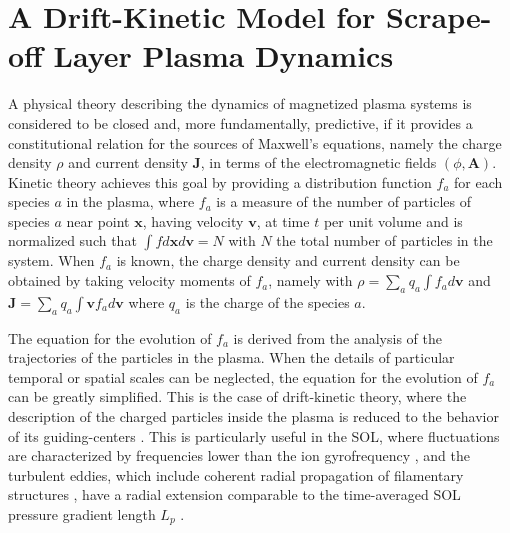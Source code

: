 \chapter{A Drift-Kinetic Model for Scrape-off Layer Plasma Dynamics}
\label{ch:dk}

A physical theory describing the dynamics of magnetized plasma systems is considered to be closed and, more fundamentally, predictive, if it provides a constitutional relation for the sources of Maxwell's equations, namely the charge density $\rho$ and current density $\mathbf{J}$, in terms of the electromagnetic fields $(\phi, \mathbf{A})$.
%
Kinetic theory achieves this goal by providing a distribution function $f_a$ for each species $a$ in the plasma, where $f_a$ is a measure of the number of particles of species $a$ near point $\mathbf x$, having velocity $\mathbf v$, at time $t$ per unit volume and is normalized such that $\int f d\mathbf x d\mathbf v=N$ with $N$ the total number of particles in the system.
%
When $f_a$ is known, the charge density and current density can be obtained by taking velocity moments of $f_a$, namely with $\rho=\sum_a q_a \int f_a d\mathbf v$ and $\mathbf{J}= \sum_a q_a \int \mathbf v f_a d \mathbf v$ where $q_a$ is the charge of the species $a$.

The equation for the evolution of $f_a$ is derived from the analysis of the trajectories of the particles in the plasma.
%
When the details of particular temporal or spatial scales can be neglected, the equation for the evolution of $f_a$ can be greatly simplified.
%
This is the case of drift-kinetic theory, where the description of the charged particles inside the plasma is reduced to the behavior of its guiding-centers \citep{Hazeltine2003}.
%
This is particularly useful in the SOL, where fluctuations are characterized by frequencies lower than the ion gyrofrequency \citep{Endler1995,Agostini2011,Carralero2014,Garcia2015}, and the turbulent eddies, which include coherent radial propagation of filamentary structures \citep{DIppolito2002,DIppolito2011,Carreras2005,Serianni2007}, have a radial extension comparable to the time-averaged SOL pressure gradient length $L_p$ \citep{Zweben2007}.

